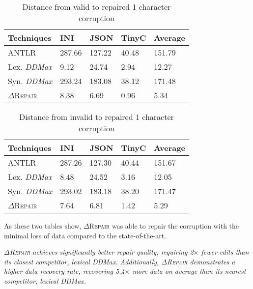 \documentclass[acmsmall,screen,review,anonymous]{acmart}
\newenvironment{result}{\begin{framed}\centering\it}{\end{framed}}
\newcommand{\approach}{\textsc{$\Delta$Repair}\xspace}
\newcommand{\ANTLR}{ANTLR\xspace}
\newcommand{\ddmax}{\textit{DDMax}\xspace}
\newcommand{\drepair}{\approach}
\begin{document}
\begin{table}[!tbp]
\centering
\caption{Distance from valid to repaired 1 character corruption}
\begin{tabular}{|p{4.0cm}|p{1.5cm}|p{1.5cm}|p{1.5cm}|p{1.5cm}|}
\hline
\textbf{Techniques} & \textbf{INI} & \textbf{JSON} & \textbf{TinyC} & \textbf{Average} \\
\hline
\ANTLR & 287.66 & 127.22 & 40.48 & 151.79 \\
Lex. \ddmax & 9.12 & 24.74 & 2.94 & 12.27 \\
Syn. \ddmax & 293.24 & 183.08 & 38.12 & 171.48 \\
\drepair & 8.38 & 6.69 & 0.96 & 5.34 \\
\hline
\end{tabular}
\label{tab:validtorepaired}
\end{table}

\begin{table}[!tbp]
\centering
\caption{Distance from invalid to repaired 1 character corruption}
\begin{tabular}{|p{4.0cm}|p{1.5cm}|p{1.5cm}|p{1.5cm}|p{1.5cm}|}
\hline
\textbf{Techniques} & \textbf{INI} & \textbf{JSON} & \textbf{TinyC} & \textbf{Average} \\
\hline
\ANTLR & 287.26 & 127.30 & 40.44 & 151.67 \\
Lex. \ddmax & 8.48 & 24.52 & 3.16 & 12.05 \\
Syn. \ddmax & 293.02 & 183.18 & 38.20 & 171.47 \\
\drepair & 7.64 & 6.81 & 1.42 & 5.29 \\
\hline
\end{tabular}
\label{tab:invalidtorepaired}
\end{table}

As these two tables show, \drepair was able to repair the corruption with the
minimal loss of data compared to the state-of-the-art.


\begin{result}
\drepair achieves significantly better repair quality, requiring 2$\times$
fewer edits than its closest competitor, lexical \ddmax.
Additionally, \drepair demonstrates a higher data recovery rate, recovering
5.4$\times$ more data on average than its nearest competitor, lexical \ddmax.
\end{result}
\end{document}
